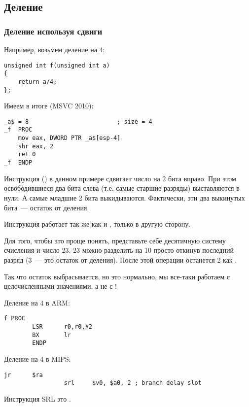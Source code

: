\subsection{Деление}

\subsubsection{Деление используя сдвиги}
\label{division_by_shifting}

Например, возьмем деление на 4:

\begin{lstlisting}
unsigned int f(unsigned int a)
{
	return a/4;
};
\end{lstlisting}

Имеем в итоге (MSVC 2010):

\begin{lstlisting}[caption=MSVC 2010]
_a$ = 8							; size = 4
_f	PROC
	mov	eax, DWORD PTR _a$[esp-4]
	shr	eax, 2
	ret	0
_f	ENDP
\end{lstlisting}

\label{SHR}
Инструкция \SHR () в данном примере сдвигает число на 2 бита вправо. 
При этом освободившиеся два бита слева (т.е. самые 
старшие разряды) выставляются в нули. А самые младшие 2 бита выкидываются. 
Фактически, эти два выкинутых бита~--- остаток от деления.

Инструкция \SHR работает так же как и \SHL, только в другую сторону.



Для того, чтобы это проще понять, представьте себе десятичную систему счисления и число 23. 
23 можно разделить на 10 просто откинув последний разряд (3~--- это остаток от деления). 
После этой операции останется 2 как .

Так что остаток выбрасывается, но это нормально, мы все-таки работаем с целочисленными
значениями, а не с !

Деление на 4 в ARM:

\begin{lstlisting}[caption=\NonOptimizingKeilVI (\ARMMode)]
f PROC
        LSR      r0,r0,#2
        BX       lr
        ENDP
\end{lstlisting}

Деление на 4 в MIPS:

\begin{lstlisting}[caption=\Optimizing GCC 4.4.5 (IDA)]
                 jr      $ra
                 srl     $v0, $a0, 2 ; branch delay slot
\end{lstlisting}

Инструкция SRL это .
